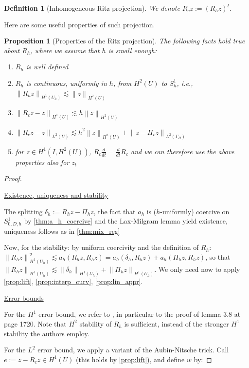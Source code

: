 \documentclass[english,a4paper,10pt,oneside]{scrbook}	%
\theoremstyle{break}
\newtheorem{defn}[equation]{Definition}
\newtheorem{prop}[equation]{Proposition}
\newenvironment{mproof}[1][\proofname]{%
  \begin{proof}[#1]$ $\par\nobreak\ignorespaces
}{%
  \end{proof}
}
\renewcommand*{\proofname}{Proof}
\theoremstyle{remark}
\newcommand{\norm}[1]{\left\lVert#1\right\rVert}
\begin{document}
\begin{appendices}
\begin{defn}[Inhomogeneous Ritz projection]
We denote $R_c z := (R_h z)^l$.

\end{defn}

Here are some useful properties of such projection.

\begin{prop}[Properties of the Ritz projection]
\label{prop:ritz}
The following facts hold true about $R_h$, where we assume that $h$ is small enough:

\begin{enumerate}
	\item $R_h$ is well defined
	\item $R_h$ is continuous, uniformly in $h$, from $H^2(U)$ to $S^1_h$, i.e., $\norm{R_hz}_{H^1(U_h)}\lesssim \norm{z}_{H^2(U)}$
	\item $\norm{R_c z - z}_{H^1(U)}\lesssim h\norm{z}_{H^2(U)}$
	\item $\norm{R_c z - z}_{L^2(U)}\lesssim h^2 \norm{z}_{H^2(U)} + \norm{z-\Pi_c z}_{L^2(\Gamma_D)}$
	\item for $z \in H^1(I,H^2(U))$, $R_c \frac{d}{dt} = \frac{d}{dt} R_c$ and we can therefore use the above properties also for $z_t$
\end{enumerate}

\end{prop}

\begin{mproof}

\underline{Existence, uniqueness and stability}

The splitting $\delta_h := R_h z - \Pi_h z$, the fact that $a_h$ is ($h$-uniformly) coercive on $S^1_{0,D,h}$ by \cref{thm:a_h_coercive} and the Lax-Milgram lemma yield existence, uniqueness follows as in \cref{thm:mix_reg}

Now, for the stability: by uniform coercivity and the definition of $R_h$: $\norm{R_h z}_{H^1(U_h)}^2 \lesssim a_h(R_h z, R_h z) = a_h(\delta_h,R_h z) + a_h(\Pi_h z, R_h z)$, so that $\norm{R_h z}_{H^1(U_h)} \lesssim \norm{\delta_h }_{H^1(U_h)} + \norm{\Pi_h z }_{H^1(U_h)}$. We only need now to apply \cref{prop:lift}, \cref{prop:interp_curv}, \cref{prop:lin_appr}.

\underline{Error bounds}

For the $H^1$ error bound, we refer to \cite{ranner}, in particular to the proof of lemma 3.8 at page 1720. Note that $H^2$ stability of $R_h$ is sufficient, instead of the stronger $H^1$ stability the authors employ.

For the $L^2$ error bound, we apply a variant of the Aubin-Nitsche trick. Call $e:= z - R_c z \in H^1(U)$ (this holds by \cref{prop:lift}), and define $w$ by:


\end{mproof}
\end{appendices}
\end{document}
